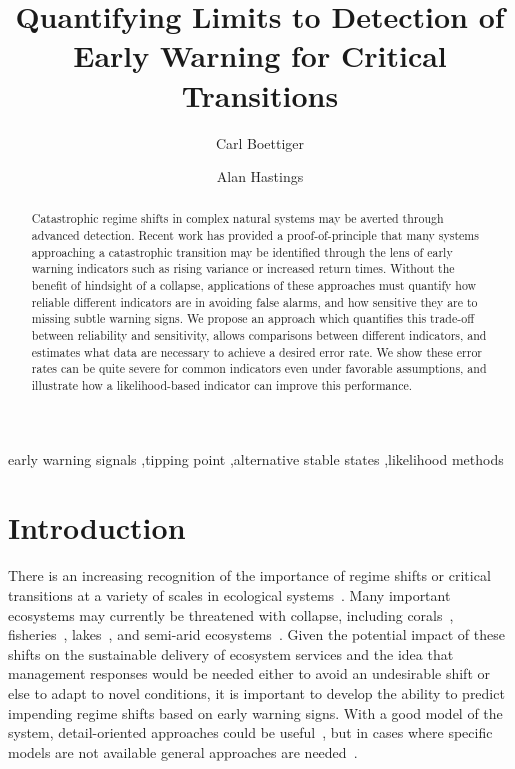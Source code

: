 \documentclass[authoryear,review,11pt]{elsarticle}
\begin{document}
\begin{frontmatter}
  \title{Quantifying Limits to Detection of Early Warning for Critical Transitions}
  \author[cpb]{Carl Boettiger}
  \author[esp]{Alan Hastings}
  \address[cpb]{Center for Population Biology, 1 Shields Avenue, University of California, Davis, CA, 95616 United States.}
  \address[esp]{Department of Environmental Science and Policy, University of California, Davis} 


  \begin{abstract}

Catastrophic regime shifts in complex natural systems may be averted through advanced detection. 
Recent work has provided a proof-of-principle that many systems approaching a catastrophic transition may be identified 
through the lens of early warning indicators such as rising variance or increased return times.  
Without the benefit of hindsight of a collapse, 
applications of these approaches must quantify how reliable different indicators are in avoiding false alarms, 
and how sensitive they are to missing subtle warning signs.  
We propose an approach which quantifies this trade-off between reliability and sensitivity, 
allows comparisons between different indicators, 
and estimates what data are necessary to achieve a desired error rate. 
We show these error rates can be quite severe for common indicators even under favorable assumptions, 
and illustrate how a likelihood-based indicator can improve this performance.  


  \end{abstract}

  \begin{keyword}
early warning signals \sep tipping point \sep alternative stable states \sep likelihood methods 
   \end{keyword}
 \end{frontmatter}

\section{Introduction}
There is an increasing recognition of the importance of regime shifts or critical transitions at a variety of scales in ecological systems~\citep{Holling1973, Wissel1984, Scheffer2001, Scheffer2009, Drake2010, Carpenter2011}⁠.
Many important ecosystems may currently be threatened with collapse, including corals~\citep{Bellwood2004}, fisheries~\citep{Berkes2006}⁠, lakes~\citep{Carpenter2011}, and semi-arid ecosystems~\citep{Kefi2007}⁠. 
Given the potential impact of  these shifts on the sustainable delivery of ecosystem services
and the idea that management responses would be needed either to avoid an undesirable shift or else to adapt to novel conditions,
it is important to develop the ability to predict impending regime shifts based on early warning signs. 
With a good model of the system, detail-oriented approaches could be useful~\citep{Lenton2009},
but in cases where specific models are not available general approaches are needed~\citep{Scheffer2009}⁠.
\end{document}
